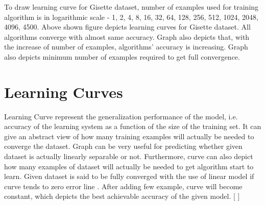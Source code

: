 \documentclass{article}
\begin{document}
To draw learning curve for Gisette dataset, number of examples used for training algorithm is in logarithmic scale - 1, 2, 4, 8, 16, 32, 64, 128, 256, 512, 1024, 2048, 4096, 4500. Above shown figure depicts learning curves for Gisette dataset. All algorithms converge with almost same accuracy. Graph also depicts that, with the increase of number of examples, algorithms' accuracy is increasing. Graph also depicts minimum number of examples required to get full convergence. 
\section{Learning Curves}
Learning Curve represent the generalization performance of the model, i.e. accuracy  of the learning system as a function of the size of the training set. It  can give an abstract view of how many training examples will actually be needed to converge the dataset. Graph can be very useful for predicting whether given dataset is actually linearly separable or not. Furthermore, curve can also depict how many examples of dataset will actually be needed to get algorithm start to learn. Given dataset is said to be fully converged with the use of linear model if curve tends to zero error line . After adding few example, curve will become constant, which depicts the best achievable accuracy of the given model. [ \cite{Book1} ]
\end{document}

